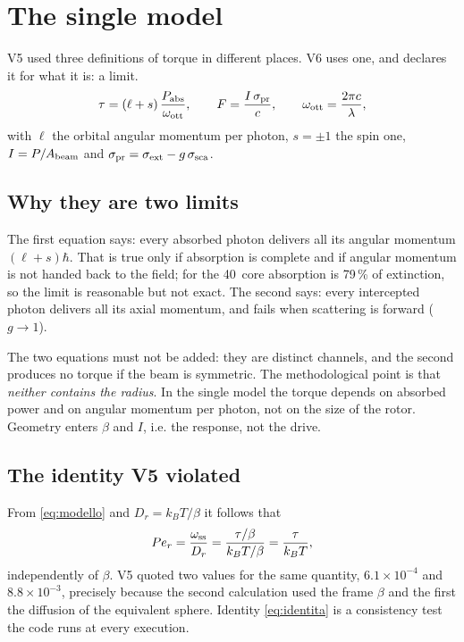 \documentclass[11pt,a4paper]{article}
\providecommand{\SI}[2]{#1\,\text{#2}}
\begin{document}
\section{The single model}

V5 used three definitions of torque in different places. V6 uses one, and declares it
for what it is: a limit.
\begin{equation}
\tau=(\ell+s)\,\frac{P_{\rm abs}}{\omega_{\rm ott}},
\qquad
F=\frac{I\,\sigma_{\rm pr}}{c},
\qquad
\omega_{\rm ott}=\frac{2\pi c}{\lambda},
\label{eq:modello}
\end{equation}
with $\ell$ the orbital angular momentum per photon, $s=\pm1$ the spin one,
$I=P/A_{\rm beam}$ and $\sigma_{\rm pr}=\sigma_{\rm ext}-g\,\sigma_{\rm sca}$.

\subsection{Why they are two limits}

The first equation says: every absorbed photon delivers all its angular momentum
$(\ell+s)\hbar$. That is true only if absorption is complete and if angular momentum
is not handed back to the field; for the \SI{40}{nm} core absorption is 79\,\% of
extinction, so the limit is reasonable but not exact. The second says: every
intercepted photon delivers all its axial momentum, and fails when scattering is
forward ($g\to1$).

The two equations must not be added: they are distinct channels, and the second
produces no torque if the beam is symmetric. The methodological point is that
\emph{neither contains the radius}. In the single model the torque depends on absorbed
power and on angular momentum per photon, not on the size of the rotor. Geometry
enters $\beta$ and $I$, i.e. the response, not the drive.

\subsection{The identity V5 violated}

From \eqref{eq:modello} and $D_r=k_BT/\beta$ it follows that
\begin{equation}
Pe_r=\frac{\omega_{\rm ss}}{D_r}=\frac{\tau/\beta}{k_BT/\beta}=\frac{\tau}{k_BT},
\label{eq:identita}
\end{equation}
independently of $\beta$. V5 quoted two values for the same quantity,
$6.1\times10^{-4}$ and $8.8\times10^{-3}$, precisely because the second calculation
used the frame $\beta$ and the first the diffusion of the equivalent sphere. Identity
\eqref{eq:identita} is a consistency test the code runs at every execution.
\end{document}
